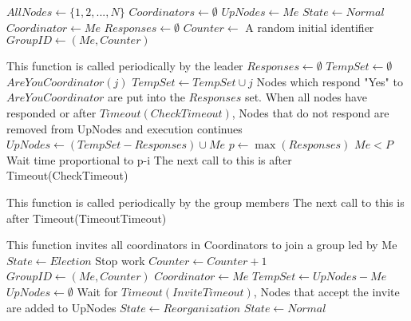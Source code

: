 \begin{algorithmic}

\State $AllNodes \gets \{ 1, 2, ..., N \}$
\State $Coordinators \gets \emptyset$
\State $UpNodes \gets { Me }$
\State $State \gets Normal$
\State $Coordinator \gets Me$
\State $Responses \gets \emptyset$
\State $Counter \gets$ A random initial identifier
\State $GroupID \gets (Me,Counter)$

\State

    \State This function is called periodically by the leader
        \State $Responses \gets \emptyset$
        \State $TempSet \gets \emptyset$
            \State $AreYouCoordinator(j)$
            \State $TempSet \gets TempSet \cup j$
        \EndFor
        \State Nodes which respond "Yes" to $AreYouCoordinator$ are put into the $Responses$ set. When all nodes have responded or after $Timeout(CheckTimeout)$, Nodes that do not respond are removed from UpNodes and execution continues
        \State $UpNodes \gets (TempSet-Responses) \cup {Me}$
            \Return
        \EndIf
        \State $p \gets \max(Responses)$
        \If $Me < P$
            \State Wait time proportional to p-i
        \EndIf
    \EndIf
    \State The next call to this is after Timeout(CheckTimeout)
\EndFunction

\State

    \State This function is called periodically by the group members
        \Return
    \Else
        \EndIf
    \EndIf
    \State The next call to this is after Timeout(TimeoutTimeout)
\EndFunction

\State

    \State This function invites all coordinators in Coordinators to join a group led by Me
    \State $State \gets Election$
    \State Stop work
    \State $Counter \gets Counter+1$
    \State $GroupID \gets (Me,Counter)$
    \State $Coordinator \gets Me$
    \State $TempSet \gets UpNodes - {Me}$
    \State $UpNodes \gets \emptyset$
    \EndFor
    \EndFor
    \State Wait for $Timeout(InviteTimeout)$, Nodes that accept the invite are added to UpNodes
    \State $State \gets Reorganization$
    \EndFor
    \State $State \gets Normal$
\EndFunction


\end{algorithmic}
